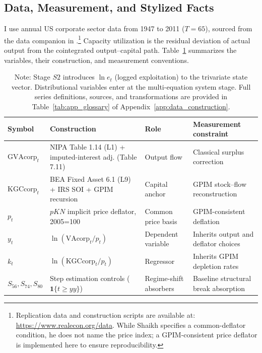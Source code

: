 \subsection{Data, Measurement, and Stylized Facts}
\label{subsec:data_measurement}

I use annual US corporate sector data from 1947 to 2011 ($T = 65$), sourced from the data companion in \citet{Shaikh2016}.\footnote{Replication data and construction scripts are available at: \url{https://www.realecon.org/data}. While Shaikh specifies a common-deflator condition, he does not name the price index; a GPIM-consistent price deflator is implemented here to ensure reproducibility.} Capacity utilization is the residual deviation of actual output from the cointegrated output--capital path. Table~\ref{tab:variables_replication} summarizes the variables, their construction, and measurement conventions.

\begin{table}[h!]
\centering
\caption{Core replication variables: symbols, sources, and transformations}
\label{tab:variables_replication}
\small
\begin{tabular}{@{}>{\raggedright\arraybackslash}p{2.8cm}>{\raggedright\arraybackslash}p{4.5cm}>{\raggedright\arraybackslash}p{2.2cm}>{\raggedright\arraybackslash}p{3.2cm}@{}}
\toprule
Symbol & Construction & Role & Measurement constraint \\
\midrule
$\text{GVAcorp}_t$ & NIPA Table 1.14 (L1) + imputed-interest adj. (Table 7.11) & Output flow & Classical surplus correction \\
$\text{KGCcorp}_t$ & BEA Fixed Asset 6.1 (L9) + IRS SOI + GPIM recursion & Capital anchor & GPIM stock--flow reconstruction \\
$p_t$ & $pKN$ implicit price deflator, 2005=100 & Common price basis & GPIM-consistent deflation \\
$y_t$ & $\ln(\text{VAcorp}_t/p_t)$ & Dependent variable & Inherits output and deflator choices \\
$k_t$ & $\ln(\text{KGCcorp}_t/p_t)$ & Regressor & Inherits GPIM depletion rates \\
$S_{56},S_{74},S_{80}$ & Step estimation controls ($\mathbf{1}\{t \ge yy\}$) & Regime-shift absorbers & Baseline structural break absorption \\
\bottomrule
\end{tabular}
\caption*{\footnotesize Note: Stage $S2$ introduces $\ln e_t$ (logged exploitation) to the trivariate state vector. Distributional variables enter at the multi-equation system stage. Full series definitions, sources, and transformations are provided in Table~\ref{tab:app_glossary} of Appendix~\ref{app:data_construction}.}
\end{table}

